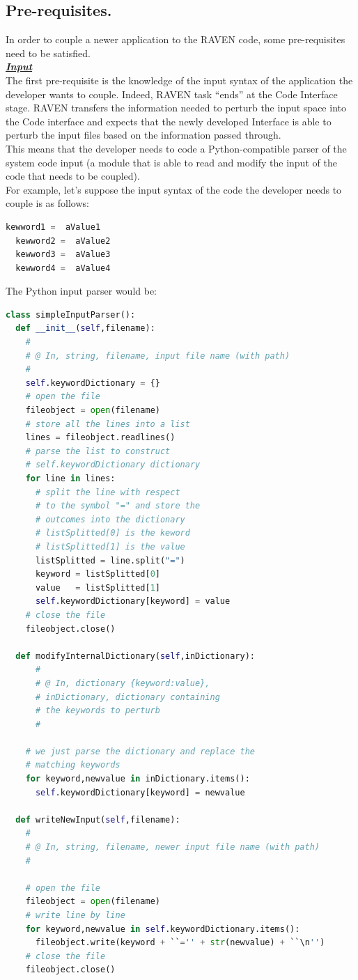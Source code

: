 \subsection{Pre-requisites.} 
\label{subsec:prerequisites}
In order to couple a newer application to the RAVEN code, some pre-requisites need to be satisfied.
\newline
\\\textbf{\textit{\underline{Input}}}
\newline
\\ The first pre-requisite is the knowledge of the input 
syntax of the application the developer wants to couple. Indeed, RAVEN task
 ``ends'' at the Code Interface stage. RAVEN transfers the information needed 
 to perturb the input space into the Code interface and expects that the newly 
 developed Interface is able to perturb the input files based on the information 
 passed through.
\\This means that the developer needs to code a Python-compatible parser of
 the system code input (a module that is able to read and modify the input of 
 the code that needs to be coupled).
\\ For example, let's suppose the input syntax of the code the developer needs 
to couple is as follows:
\begin{lstlisting}[language=python]
  kewword1 =  aValue1
  kewword2 =  aValue2
  kewword3 =  aValue3
  kewword4 =  aValue4
\end{lstlisting} 
The Python input parser would be:
\begin{lstlisting}[language=python]
class simpleInputParser():
  def __init__(self,filename):
    # 
    # @ In, string, filename, input file name (with path)
    #
    self.keywordDictionary = {}
    # open the file
    fileobject = open(filename)
    # store all the lines into a list
    lines = fileobject.readlines()
    # parse the list to construct 
    # self.keywordDictionary dictionary
    for line in lines:
      # split the line with respect
      # to the symbol "=" and store the
      # outcomes into the dictionary
      # listSplitted[0] is the keword
      # listSplitted[1] is the value
      listSplitted = line.split("=")
      keyword = listSplitted[0]
      value   = listSplitted[1]
      self.keywordDictionary[keyword] = value
    # close the file
    fileobject.close()
   
  def modifyInternalDictionary(self,inDictionary):
      # 
      # @ In, dictionary {keyword:value}, 
      # inDictionary, dictionary containing
      # the keywords to perturb 
      #

    # we just parse the dictionary and replace the
    # matching keywords
    for keyword,newvalue in inDictionary.items():
      self.keywordDictionary[keyword] = newvalue

  def writeNewInput(self,filename):
    #
    # @ In, string, filename, newer input file name (with path)
    #

    # open the file
    fileobject = open(filename)
    # write line by line
    for keyword,newvalue in self.keywordDictionary.items():
      fileobject.write(keyword + ``='' + str(newvalue) + ``\n'')
    # close the file
    fileobject.close()
\end{lstlisting} 
